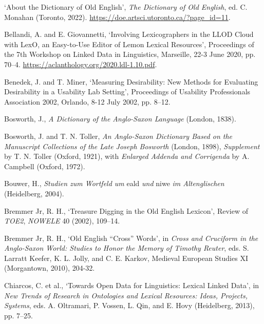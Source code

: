 \begin{list}{}%
{\leftmargin=0.5in \itemindent=-0.5in}
\setlength{\itemsep}{0pt}
\setlength{\parskip}{0pt}
\setlength{\parsep}{0pt}


\item %
`About the Dictionary of Old English', \textit{The Dictionary of Old English}, ed. C. Monahan (Toronto, 2022). \url{https://doe.artsci.utoronto.ca/?page_id=11}.

\item %
Bellandi, A. and E. Giovannetti, `Involving Lexicographers in the LLOD Cloud with LexO, an Easy-to-Use Editor of Lemon Lexical Resources', Proceedings of the 7th Workshop on Linked Data in Linguistics, Marseille, 22-3 June 2020, pp. 70–4. \url{https://aclanthology.org/2020.ldl-1.10.pdf}.

\item %
Benedek, J. and T. Miner, `Measuring Desirability: New Methods for Evaluating Desirability in a Usability Lab Setting', Proceedings of Usability Professionals Association 2002, Orlando, 8-12 July 2002, pp. 8–12.

\item
Bosworth, J., \textit{A Dictionary of the Anglo-Saxon Language} (London, 1838).

\item
Bosworth, J. and T. N. Toller, \textit{An Anglo-Saxon Dictionary Based on the Manuscript Collections of the Late Joseph Bosworth} (London, 1898), \textit{Supplement} by T. N. Toller (Oxford, 1921), with \textit{Enlarged Addenda and Corrigenda} by A. Campbell (Oxford, 1972).

\item %
Bouwer, H., \textit{Studien zum Wortfeld um} eald \textit{und} niwe \textit{im Altenglischen} (Heidelberg, 2004).

\item %
Bremmer Jr, R. H., `Treasure Digging in the Old English Lexicon', Review of \textit{TOE2}, \textit{NOWELE} 40 (2002), 109–14.

\item %
Bremmer Jr, R. H., `Old English ``Cross'' Words', in \textit{Cross and Cruciform in the Anglo-Saxon World: Studies to Honor the Memory of Timothy Reuter}, eds. S. Larratt Keefer, K. L. Jolly, and C. E. Karkov, Medieval European Studies XI (Morgantown, 2010), 204-32.

\item %
Chiarcos, C. et al., `Towards Open Data for Linguistics: Lexical Linked Data', in \textit{New Trends of Research in Ontologies and Lexical Resources: Ideas, Projects, Systems}, eds. A. Oltramari, P. Vossen, L. Qin, and E. Hovy (Heidelberg, 2013), pp. 7–25.


\end{list}
